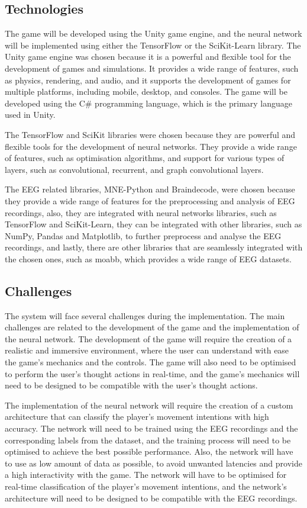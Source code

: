 \subsection{Technologies}
The game will be developed using the Unity game engine, and the neural network will be implemented using either the TensorFlow or the SciKit-Learn library.
The Unity game engine was chosen because it is a powerful and flexible tool for the development of games and simulations.
It provides a wide range of features, such as physics, rendering, and audio, and it supports the development of games for multiple platforms, including mobile, desktop, and consoles.
The game will be developed using the C\# programming language, which is the primary language used in Unity.

The TensorFlow and SciKit libraries were chosen because they are powerful and flexible tools for the development of neural networks.
They provide a wide range of features, such as optimisation algorithms, and support for various types of layers, such as convolutional, recurrent, and graph convolutional layers.

The EEG related libraries, MNE-Python and Braindecode, were chosen because they provide a wide range of features for the preprocessing and analysis of EEG recordings, also, they are integrated with neural networks libraries, such as TensorFlow and SciKit-Learn, they can be integrated with other libraries, such as NumPy, Pandas and Matplotlib, to further preprocess and analyse the EEG recordings, and lastly, there are other libraries that are seamlessly integrated with the chosen ones, such as moabb, which provides a wide range of EEG datasets.

\subsection{Challenges}
The system will face several challenges during the implementation.
The main challenges are related to the development of the game and the implementation of the neural network.
The development of the game will require the creation of a realistic and immersive environment, where the user can understand with ease the game's mechanics and the controls.
The game will also need to be optimised to perform the user's thought actions in real-time, and the game's mechanics will need to be designed to be compatible with the user's thought actions.

The implementation of the neural network will require the creation of a custom architecture that can classify the player's movement intentions with high accuracy.
The network will need to be trained using the EEG recordings and the corresponding labels from the dataset, and the training process will need to be optimised to achieve the best possible performance.
Also, the network will have to use as low amount of data as possible, to avoid unwanted latencies and provide a high interactivity with the game.
The network will have to be optimised for real-time classification of the player's movement intentions, and the network's architecture will need to be designed to be compatible with the EEG recordings.

